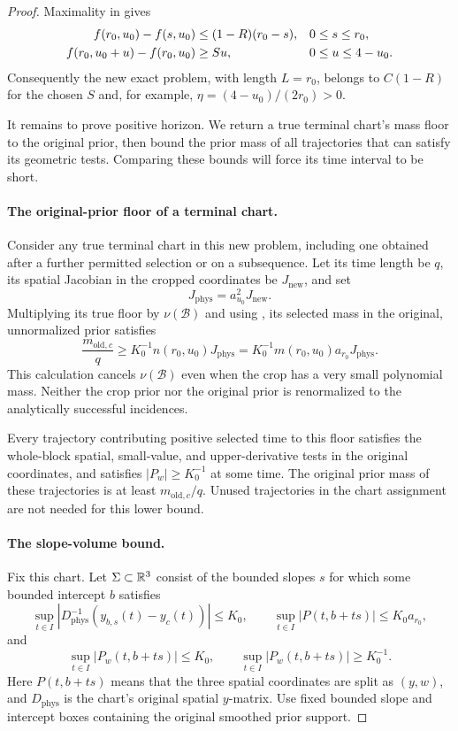 \begin{proof}
Maximality in  gives
\begin{align}
 f(r_0,u_0)-f(s,u_0)
   &\le(1-R)(r_0-s),&&0\le s\le r_0,
 \label{a01:crop-cap}\\
 f(r_0,u_0+u)-f(r_0,u_0)
   &\ge Su,&&0\le u\le4-u_0.
 \notag
\end{align}
Consequently the new exact problem, with length
\(L=r_0\), belongs to \(C(1-R)\) for the chosen \(S\)
and, for example,
\(\eta=(4-u_0)/(2r_0)>0\).

It remains to prove positive horizon. We return a true terminal
chart's mass floor to the original prior, then bound the prior
mass of all trajectories that can satisfy its geometric tests.
Comparing these bounds will force its time interval to be short.

\paragraph{The original-prior floor of a terminal chart.}
Consider any true terminal chart in this new problem,
including one obtained after a further permitted
selection or on a subsequence.
Let its time length be \(q\), its spatial Jacobian
in the cropped coordinates be \(J_{\mathrm{new}}\),
and set
\[
 J_{\mathrm{phys}}=a_{u_0}^2J_{\mathrm{new}}.
\]
Multiplying its true floor by \(\nu(\mathcal B)\)
and using , its selected mass
in the original, unnormalized prior satisfies
\begin{equation}
 \frac{m_{\mathrm{old},c}}q
 \ge K_0^{-1}n(r_0,u_0)J_{\mathrm{phys}}
 =K_0^{-1}m(r_0,u_0)a_{r_0}J_{\mathrm{phys}}.
 \label{a01:original-chart-floor}
\end{equation}
This calculation cancels \(\nu(\mathcal B)\) even
when the crop has a very small polynomial mass.
Neither the crop prior nor the original prior is
renormalized to the analytically successful incidences.

Every trajectory contributing positive selected time
to this floor satisfies the whole-block spatial,
small-value, and upper-derivative tests in the original
coordinates, and satisfies \(|P_w|\ge K_0^{-1}\)
at some time.  The original prior mass of these
trajectories is at least \(m_{\mathrm{old},c}/q\).
Unused trajectories in the chart assignment are not
needed for this lower bound.

\paragraph{The slope-volume bound.}
Fix this chart.
Let \(\Sigma\subset\mathbb R^3\) consist of the bounded slopes
\(s\) for which some bounded intercept \(b\) satisfies
\[
 \sup_{t\in I}|D_{\mathrm{phys}}^{-1}
                (y_{b,s}(t)-y_c(t))|\le K_0,\qquad
 \sup_{t\in I}|P(t,b+ts)|\le K_0a_{r_0},
\]
and
\[
 \sup_{t\in I}|P_w(t,b+ts)|\le K_0,\qquad
 \sup_{t\in I}|P_w(t,b+ts)|\ge K_0^{-1}.
\]
Here \(P(t,b+ts)\) means that the three spatial
coordinates are split as \((y,w)\), and
\(D_{\mathrm{phys}}\) is the chart's original spatial
\(y\)-matrix.
Use fixed bounded slope and intercept boxes containing
the original smoothed prior support.


\end{proof}
